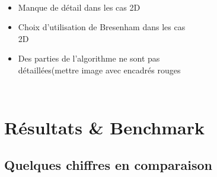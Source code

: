 \begin{frame}[fragile=singleslide]{\insertsectionhead}
  \framesubtitle{\insertsubsectionhead}
  \begin{columns}[T,onlytextwidth]
      \begin{itemize}
        \vspace{.55cm}
        \item Manque de détail dans les cas 2D
        \vspace{.3cm}
        \item Choix d’utilisation de Bresenham dans les cas 2D
        \vspace{.3cm}
        \item Des parties de l'algorithme ne sont pas détaillées(mettre image avec encadrés rouges
      \end{itemize}
    \begin{figure}
        \begin{subfigure}{.9\textwidth}
        \end{subfigure}
      \end{figure}
  \end{columns}
\end{frame}

\section{Résultats \& Benchmark}

\subsection{Quelques chiffres en comparaison}

